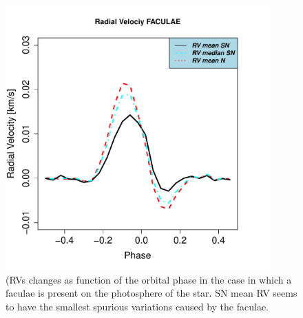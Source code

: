 \documentclass[11pt, oneside]{article}
\begin{document}
{\begin{figure}[htbp]
   \centering
\includegraphics[height = 4in]{RV_comparison_FACULAE.pdf} 
\caption{(RVs changes as function of the orbital phase in the case in which a faculae is present on the photosphere of the star. SN mean RV seems to have the smallest spurious variations caused by the faculae.}
    \label{fig:faculae}
\end{figure}

}
\end{document}
